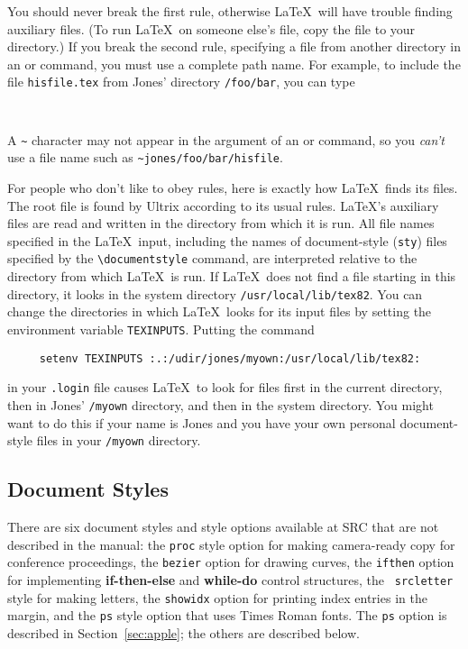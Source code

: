 You should never break the first rule, otherwise \LaTeX\ will have
trouble finding auxiliary files.  (To run \LaTeX\ on someone else's
file, copy the file to your directory.) If you break the second
rule, specifying a file from another directory in an
\hbox{\verb||} or \hbox{\verb||} command, you must use a
complete path name.  For example, to include the file \mbox{\tt hisfile.tex} 
from Jones' directory \hbox{\verb|/foo/bar|}, you can type
\begin{verbatim}
     
\end{verbatim}
A \verb|~| character may not appear in the argument of an
\hbox{\verb||} or \hbox{\verb||} command, so you {\em
can't\/} use a file name such as \hbox{\verb|~jones/foo/bar/hisfile|}.

For people who don't like to obey rules, 
here is exactly how \LaTeX\ finds its
files.  The root file is found by Ultrix according to its usual rules.
\LaTeX's auxiliary files are read and written in the directory from
which it is run.  All file names specified in the \LaTeX\ input,
including the names of document-style ({\tt sty}) files specified by
the \hbox{\verb|\documentstyle|} command, are interpreted relative to
the directory from which \LaTeX\ is run.  If \LaTeX\ does not find a
file starting in this directory, it looks in the system directory
\hbox{\verb|/usr/local/lib/tex82|}.  You can change the directories in
which \LaTeX\ looks for its input files by setting the environment
variable \mbox{\tt TEXINPUTS}.  Putting the command
\begin{verbatim}
     setenv TEXINPUTS :.:/udir/jones/myown:/usr/local/lib/tex82:
\end{verbatim}
in your \mbox{\tt .login} file causes \LaTeX\ to look for files first
in the current directory, then in Jones' {\tt /myown} directory, and
then in the system directory.  You might want to do this if your name
is Jones and you have your own personal document-style files in your
{\tt /myown} directory. 

\subsection{Document Styles}


There are six document styles and style options available at SRC that
are not described in the manual: the \mbox{\tt proc} style option for
making camera-ready copy for conference proceedings, the {\tt bezier}
option for drawing curves, the {\tt ifthen} option for implementing
{\bf if-then-else} and {\bf while-do} control structures, the \mbox{\tt
srcletter} style for making letters, the {\tt showidx} option for
printing index entries in the margin,
and the {\tt ps} style option that
uses Times Roman fonts.  The {\tt ps} option is described in
Section~\ref{sec:apple}; the others are described below.


